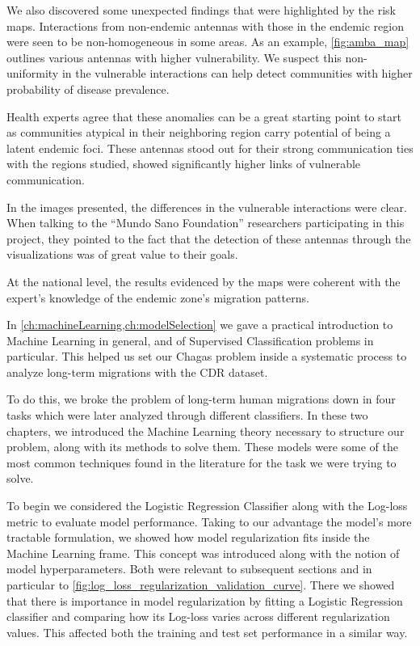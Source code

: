 We also discovered some unexpected findings that were highlighted by the risk maps.
Interactions from non-endemic antennas with those in the endemic region were seen to be non-homogeneous in some areas.
As an example, \cref{fig:amba_map} outlines various antennas with higher vulnerability.
We suspect this non-uniformity in the vulnerable interactions can help detect communities with higher probability of disease prevalence.

Health experts agree that these anomalies can be a great starting point to start as communities atypical in their neighboring region carry potential of being a latent endemic foci.
These antennas stood out for their strong communication ties with the regions studied, showed significantly higher links of vulnerable communication.

In the images presented, the differences in the vulnerable interactions were clear.
When talking to the ``Mundo Sano Foundation'' researchers participating in this project, they pointed to the fact that the detection of these antennas through the visualizations was of great value to their goals.


At the national level, the results evidenced by the maps were coherent with the expert's knowledge of the endemic zone's migration patterns.



In \cref{ch:machineLearning,ch:modelSelection} we gave a practical introduction to Machine Learning in general, and of Supervised Classification problems in particular.
This helped us set our Chagas problem inside a systematic process to analyze long-term migrations with the CDR dataset.

To do this, we broke the problem of long-term human migrations down in four tasks which were later analyzed through different classifiers.
In these two chapters, we introduced the Machine Learning theory necessary to structure our problem, along with its methods to solve them.
These models were some of the most common techniques found in the literature for the task we were trying to solve.

To begin we considered the Logistic Regression Classifier along with the Log-loss metric to evaluate model performance.
Taking to our advantage the model's more tractable formulation, we showed how model regularization fits inside the Machine Learning frame.
This concept was introduced along with the notion of model hyperparameters.
Both were relevant to subsequent sections and in particular to \cref{fig:log_loss_regularization_validation_curve}.
There we showed that there is importance in model regularization by fitting a Logistic Regression classifier and comparing how its Log-loss varies across different regularization values.
This affected both the training and test set performance in a similar way.


